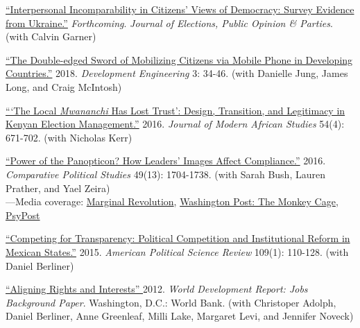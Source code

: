 \documentclass[margin,line]{res}
\begin{document}
{\begin{resume}
\begin{etaremune}
 \item \href{https://doi.org/10.1080/17457289.2018.1554664}{
   ``Interpersonal
     Incomparability in Citizens' Views of Democracy: Survey Evidence
     from Ukraine.''} \emph{Forthcoming}. \emph{Journal of Elections,
     Public Opinion \& Parties}. (with Calvin Garner)

 \item  \href{https://doi.org/10.1016/j.deveng.2017.11.001}{``The Double-edged Sword of Mobilizing Citizens via Mobile Phone in
  Developing Countries.''} 2018. \emph{Development
    Engineering}  3: 34-46. (with Danielle Jung, James Long, and Craig McIntosh)

  \item \href{
https://doi.org/10.1017/S0022278X16000604}{```The Local \emph{Mwananchi} Has Lost Trust': Design, Transition,
  and Legitimacy in Kenyan Election Management.''} 2016. \emph{Journal
    of Modern African Studies} 54(4): 671-702. (with Nicholas Kerr)

 \item  \href{https://doi.org/10.1177/0010414016633228}
{``Power of the Panopticon? How Leaders' Images Affect Compliance.''}
  2016.  \emph{Comparative Political Studies} 49(13): 1704-1738. (with
  Sarah Bush, Lauren Prather, and Yael Zeira)\\
  ---Media coverage: \href{https://marginalrevolution.com/marginalrevolution/2016/07/results-free-review.html}{Marginal Revolution},
  \href{https://www.washingtonpost.com/news/monkey-cage/wp/2016/08/25/heres-what-happens-when-scientists-evaluate-research-without-knowing-the-results/?noredirect=on&utm_term=.77408b17a4a9}
  {Washington Post: The Monkey Cage}, \href{https://www.psypost.org/2016/12/scientists-investigate-subliminal-authoritarian-imagery-encourages-citizens-obey-46570}{ PsyPost}

 \item  \href{https://doi.org/10.1177/0010414016633228}{``Competing for Transparency: Political Competition and
  Institutional Reform in Mexican States.''} 2015. \emph{American
  Political Science Review} 109(1): 110-128. (with Daniel Berliner)


\item \href{http://siteresources.worldbank.org/EXTNWDR2013/Resources/8258024-1320950747192/8260293-1320956712276/8261091-1348683883703/WDR2013_bp_Aligning_Rights_and_Incentives.pdf}{``Aligning Rights and
Interests'' } 2012. \emph{World
  Development Report: Jobs Background Paper}. Washington, D.C.: World
Bank. (with Christoper Adolph, Daniel Berliner, Anne
Greenleaf, Milli Lake, Margaret Levi, and Jennifer Noveck)
\end{etaremune}



\end{resume}}
\end{document}
